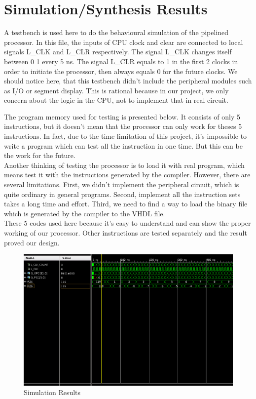 \documentclass[12pt,a4paper]{report}
\begin{document}
\section{Simulation/Synthesis Results}
A testbench is used here to do the behavioural simulation of the pipelined processor. In this file, the inputs of CPU clock and clear are connected to local signals L\_CLK and L\_CLR respectively. The signal L\_CLK changes itself between 0 1 every 5 ns. The signal L\_CLR equals to 1 in the first 2 clocks in order to initiate the processor, then always equals 0 for the future clocks. We should notice here, that this testbench didn't include the peripheral modules such as I/O or segment display. This is rational because in our project, we only concern about the logic in the CPU, not to implement that in real circuit.

The program memory used for testing is presented below. It consists of only 5 instructions, but it doesn't mean that the processor can only work for theses 5 instructions. In fact, due to the time limitation of this project, it's impossible to write a program which can test all the instruction in one time. But this can be the work for the future.\\
Another thinking of testing the processor is to load it with real program, which means test it with the instructions generated by the compiler. However, there are several limitations. First, we didn't implement the peripheral circuit, which is quite ordinary in general programs. Second, implement all the instruction sets takes a long time and effort. Third, we need to find a way to load the binary file which is generated by the compiler to the VHDL file. \\
These 5 codes used here because it's easy to understand and can show the proper working of our processor. Other instructions are tested separately and the result proved our design.\\

\begin{figure}[h]
  \centering
  \includegraphics[width=\textwidth]{waveform}
  \caption{Simulation Results}
  \label{fig:waveform}
\end{figure}
\end{document}
